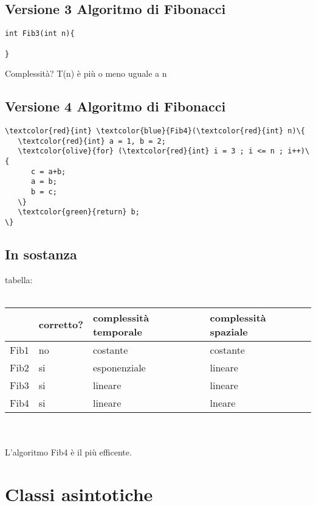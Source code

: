 \documentclass[12pt, letterpaper]{article}
\begin{document}
\subsection{Versione 3 Algoritmo di Fibonacci}

\begin{Verbatim}
int Fib3(int n){

}
\end{Verbatim}
Complessità? T(n) è più o meno uguale a n

\subsection{Versione 4 Algoritmo di Fibonacci}

\begin{Verbatim}[commandchars=\\\{\}]
\textcolor{red}{int} \textcolor{blue}{Fib4}(\textcolor{red}{int} n)\{
   \textcolor{red}{int} a = 1, b = 2;
   \textcolor{olive}{for} (\textcolor{red}{int} i = 3 ; i <= n ; i++)\{
      c = a+b;
      a = b;
      b = c;
   \}
   \textcolor{green}{return} b;
\} 
\end{Verbatim}

\subsection{In sostanza}

tabella:\\
\\
\begin{tabularx}{0.85\textwidth} { 
  | >{\raggedright\arraybackslash}X 
  | >{\centering\arraybackslash}X 
 | >{\centering\arraybackslash}X 
  | >{\centering\arraybackslash}X | }
 \hline
   & \textbf{corretto?} & \textbf{complessità temporale} & \textbf{complessità spaziale}  \\
 \hline
 Fib1 & no & costante & costante  \\
 \hline
 Fib2  & si  & esponenziale & lineare  \\
 \hline
 Fib3  & si  & lineare  & lineare  \\
 \hline
 Fib4  & si  & lineare & lneare  \\
\hline
\end{tabularx}
\\
\\
L'algoritmo Fib4 è il più efficente.

\section{Classi asintotiche}
\end{document}
